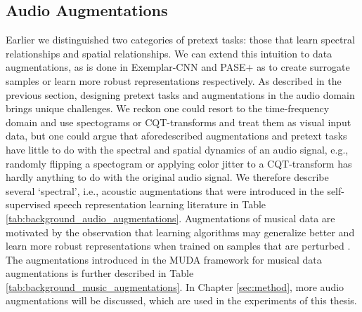 \subsection{Audio Augmentations}\label{sec:audio_transformations}
Earlier we distinguished two categories of pretext tasks: those that learn spectral relationships and spatial relationships. We can extend this intuition to data augmentations, as is done in Exemplar-CNN \cite{dosovitskiy_discriminative_2014} and PASE$+$ \cite{Ravanelli2020} as to create surrogate samples or learn more robust representations respectively. As described in the previous section, designing pretext tasks and augmentations in the audio domain brings unique challenges. We reckon one could resort to the time-frequency domain and use spectograms or CQT-transforms and treat them as visual input data, but one could argue that aforedescribed augmentations and pretext tasks have little to do with the spectral and spatial dynamics of an audio signal, e.g., randomly flipping a spectogram or applying color jitter to a CQT-transform has hardly anything to do with the original audio signal. We therefore describe several `spectral', i.e., acoustic augmentations that were introduced in the self-supervised speech representation learning literature \cite{Ravanelli2020} in Table \ref{tab:background_audio_augmentations}. Augmentations of musical data are motivated by the observation that learning algorithms may generalize better and learn more robust representations when trained on samples that are perturbed \cite{Sturm2015}. The augmentations introduced in the MUDA framework for musical data augmentations is further described in Table \ref{tab:background_music_augmentations}. In Chapter \ref{sec:method}, more audio augmentations will be discussed, which are used in the experiments of this thesis.

\begin{table}[h]
    \centering
    \caption{Audio augmentations used in the speech domain to learn more robust representations using self-supervised learning methods.}
    \label{tab:background_audio_augmentations}
\end{table}


